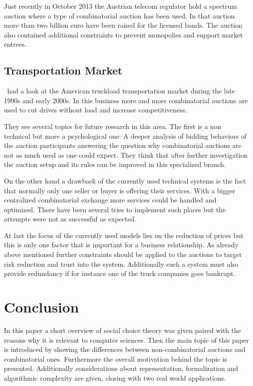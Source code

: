 \documentclass[a4paper]{paper}
\begin{document}
Just recently in October 2013 the Austrian telecom regulator hold a spectrum auction where a type of combinatorial auction has been used. In that auction more than two billion euro have been raised for the licensed bands. The auction also contained additional constraints to prevent monopolies and support market entrees.~\cite{RTR:Telecom}

\subsection{Transportation Market}
\cite{CS06}~had a look at the American truckload transportation market during the late 1990s and early 2000s. In this business more and more combinatorial auctions are used to cut drives without load and increase competitiveness.

They see several topics for future research in this area. The first is a non technical but more a psychological one: A deeper analysis of bidding behaviors of the auction participants answering the question why combinatorial auctions are not as much used as one could expect. They think that after further investigation the auction setup and its rules can be improved in this specialized branch.

On the other hand a drawback of the currently used technical systems is the fact that normally only one seller or buyer is offering their services. With a bigger centralized combinatorial exchange more services could be handled and optimized. There have been several tries to implement such places but the attempts were not as successful as expected.

At last the focus of the currently used models lies on the reduction of prices but this is only one factor that is important for a business relationship. As already above mentioned further constraints should be applied to the auctions to target risk reduction and trust into the system. Additionally such a system must also provide redundancy if for instance one of the truck companies goes bankrupt. 

\section{Conclusion}

In this paper a short overview of social choice theory was given paired with the reasons why it is relevant to computer sciences. Then the main topic of this paper is introduced by showing the differences between non-combinatorial auctions and combinatorial ones. Furthermore the overall motivation behind the topic is presented. Additionally considerations about representation, formalization and algorithmic complexity are given, closing with two real world applications. 


\end{document}
